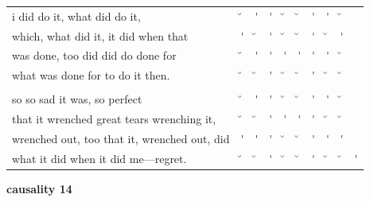 \documentclass[12pt, landscape]{article}
\begin{document}
\begin{center}
\begin{tabularx}{\textwidth}{
>{\lefting\arraybackslash}X
c
c
c
c
c
c
c
c
c
}

i did do it, what did do it, & \u{} & \'{} & \'{} & \u{} & \u{} & \'{} & \'{} & \u{} & \\
which, what did it, it did when that & \'{} & \u{} & \'{} & \u{} & \u{} & \'{} & \u{} & \'{} & \\
was done, too did did do done for & \u{} & \'{} & \'{} & \'{} & \'{} & \'{} & \'{} & \u{} & \\
what was done for to do it then. & \u{} & \u{} & \'{} & \u{} & \u{} & \'{} & \u{} & \u{} & \\
 & & & & & & & & \\
so so sad it was, so perfect & \u{} & \'{} & \'{} & \u{} & \u{} & \'{} & \'{} & \u{} & \\
that it wrenched great tears wrenching it, & \u{} & \u{} & \'{} & \'{} & \'{} & \'{} & \u{} & \u{} & \\
wrenched out, too that it, wrenched out, did & \'{} & \'{} & \'{} & \u{} & \u{} & \'{} & \'{} & \'{} & \\
what it did when it did me—regret. & \u{} & \u{} & \'{} & \u{} & \u{} & \'{} & \u{} & \u{} & \'{} \\

\end{tabularx}
\end{center}

\vspace*{\fill}

\newpage

\vspace*{\fill}

\noindent \textbf{causality 14}
\noindent \hfill \par
\end{document}
